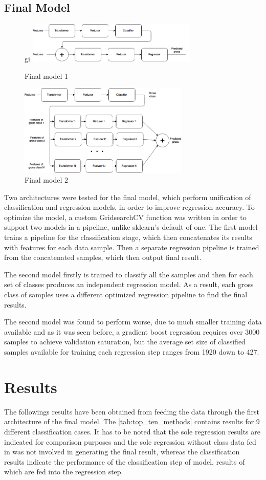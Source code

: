 \subsection{Final Model}
\begin{figure}[h]gi
\label{fig:final_model}
\centering
\includegraphics[width=3.2in]{figures/finalmodel1}
\caption{Final model 1}
\label{fig:model1}
\end{figure}
\begin{figure}[h]
\centering
\includegraphics[width=3.2in]{figures/finalmodel2}
\caption{Final model 2}
\label{fig:model2}
\end{figure}
Two architectures were tested for the final model, which perform unification of classification and regression models, in order to improve regression accuracy. To optimize the model, a custom GridsearchCV function was written in order to support two models in a pipeline, unlike sklearn's default of one. The first model trains a pipeline for the classification stage, which then concatenates its results with features for each data sample. Then a separate regression pipeline is trained from the concatenated samples, which then output final result.

The second model firstly is trained to classify all the samples and then for each set of classes produces an independent regression model. As a result, each gross class of samples uses a different optimized regression pipeline to find the final results.

The second model was found to perform worse, due to much smaller training data available and as it was seen before, a gradient boost regression requires over 3000 samples to achieve validation saturation, but the average set size of classified samples available for training each regression step  ranges from 1920 down to 427.

\section{Results}
The followings results have been obtained from feeding the data through the first architecture of the final model. The \tablename{} \ref{tab:top_ten_methods} contains results for 9 different classification cases. It has to be noted that the sole regression results are indicated for comparison purposes and the sole regression without class data fed in was not involved in generating the final result, whereas the classification results indicate the performance of the classification step of model, results of which are fed into the regression step.

